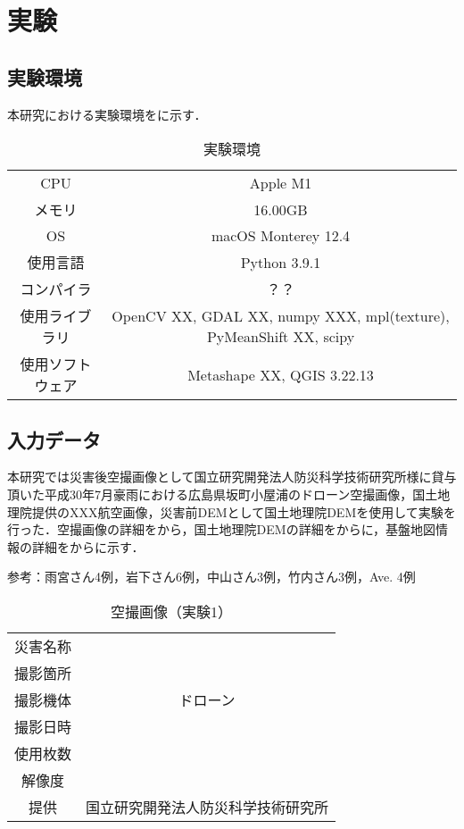 \chapter{実験}
  \section{実験環境}
    本研究における実験環境をに示す．

    \begin{table}[b]
      \centering
      \caption{実験環境}
      \label{実験環境}
      \begin{tabular}{cc}
        \hline
        CPU & Apple M1 \\
        メモリ & 16.00GB \\
        OS & macOS Monterey 12.4 \\
        使用言語 & Python 3.9.1 \\
        コンパイラ & ？？ \\
        使用ライブラリ & OpenCV XX, GDAL XX, numpy XXX, mpl(texture), PyMeanShift XX, scipy \\ 
        使用ソフトウェア & Metashape XX, QGIS 3.22.13 \\ \hline 
      \end{tabular}
    \end{table}


  \section{入力データ}
    本研究では災害後空撮画像として国立研究開発法人防災科学技術研究所様に貸与頂いた平成30年7月豪雨における広島県坂町小屋浦のドローン空撮画像\cite{}，国土地理院提供のXXX航空画像，災害前DEMとして国土地理院DEMを使用して実験を行った．空撮画像の詳細をから，国土地理院DEMの詳細をからに，基盤地図情報の詳細をからに示す．

    参考：雨宮さん4例，岩下さん6例，中山さん3例，竹内さん3例，Ave. 4例

    \begin{table}[b]
      \centering
      \caption{空撮画像（実験1）}
      \label{空撮画像1}
      \begin{tabular}{cc}
        \hline
        災害名称 &  \\
        撮影箇所 &  \\
        撮影機体 & ドローン \\
        撮影日時 &  \\
        使用枚数 & \\
        解像度 &  \\
        提供 & 国立研究開発法人防災科学技術研究所 \\ \hline
      \end{tabular}
    \end{table}

